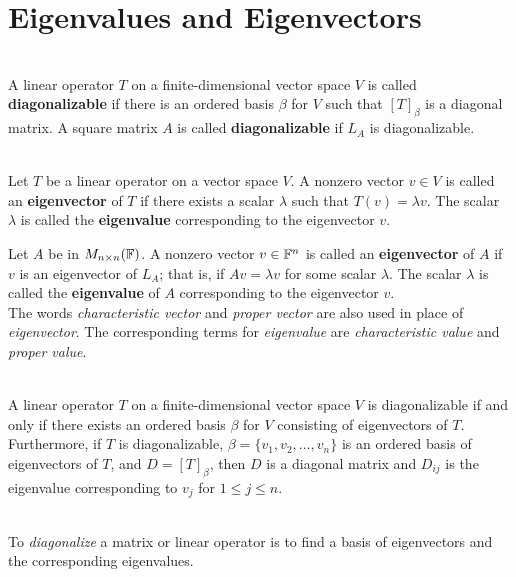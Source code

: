 \section{Eigenvalues and Eigenvectors}

\begin{definition}
	\hfill\\
	A linear operator $T$ on a finite-dimensional vector space $V$ is called \textbf{diagonalizable} if there is an ordered basis $\beta$ for $V$ such that $[T]_\beta$ is a diagonal matrix. A square matrix $A$ is called \textbf{diagonalizable} if $L_A$ is diagonalizable.
\end{definition}

\begin{definition}
	\hfill\\
	Let $T$ be a linear operator on a vector space $V$. A nonzero vector $v \in V$ is called an \textbf{eigenvector} of $T$ if there exists a scalar $\lambda$ such that $T(v) = \lambda v$. The scalar $\lambda$ is called the \textbf{eigenvalue} corresponding to the eigenvector $v$.

	Let $A$ be in $M_{n \times n}(\mathbb{F})$. A nonzero vector $v \in \mathbb{F}^n$ is called an \textbf{eigenvector} of $A$ if $v$ is an eigenvector of $L_A$; that is, if $Av = \lambda v$ for some scalar $\lambda$. The scalar $\lambda$ is called the \textbf{eigenvalue} of $A$ corresponding to the eigenvector $v$.\\

	The words \textit{characteristic vector} and \textit{proper vector} are also used in place of \textit{eigenvector}. The corresponding terms for \textit{eigenvalue} are \textit{characteristic value} and \textit{proper value}.
\end{definition}

\begin{theorem}
	\hfill\\
	A linear operator $T$ on a finite-dimensional vector space $V$ is diagonalizable if and only if there exists an ordered basis $\beta$ for $V$ consisting of eigenvectors of $T$. Furthermore, if $T$ is diagonalizable, $\beta = \{v_1, v_2, \dots, v_n\}$ is an ordered basis of eigenvectors of $T$, and $D=[T]_\beta$, then $D$ is a diagonal matrix and $D_{ij}$ is the eigenvalue corresponding to $v_j$ for $1 \leq j \leq n$.
\end{theorem}

\begin{remark}
	\hfill\\
	To \textit{diagonalize} a matrix or linear operator is to find a basis of eigenvectors and the corresponding eigenvalues.
\end{remark}

